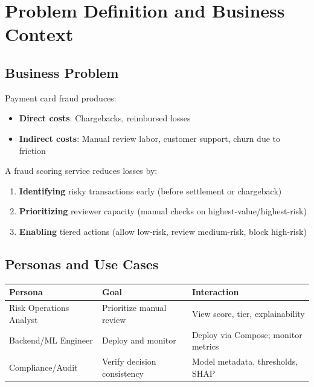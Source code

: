 \documentclass[12pt,a4paper]{article}
\begin{document}
\section{Problem Definition and Business Context}

\subsection{Business Problem}
Payment card fraud produces:
\begin{itemize}
    \item \textbf{Direct costs}: Chargebacks, reimbursed losses
    \item \textbf{Indirect costs}: Manual review labor, customer support, churn due to friction
\end{itemize}

A fraud scoring service reduces losses by:
\begin{enumerate}
    \item \textbf{Identifying} risky transactions early (before settlement or chargeback)
    \item \textbf{Prioritizing} reviewer capacity (manual checks on highest-value/highest-risk)
    \item \textbf{Enabling} tiered actions (allow low-risk, review medium-risk, block high-risk)
\end{enumerate}

\subsection{Personas and Use Cases}
\begin{table}[H]
\centering
\begin{tabular}{|l|l|l|}
\hline
\textbf{Persona} & \textbf{Goal} & \textbf{Interaction} \\
\hline
Risk Operations Analyst & Prioritize manual review & View score, tier, explainability \\
\hline
Backend/ML Engineer & Deploy and monitor & Deploy via Compose; monitor metrics \\
\hline
Compliance/Audit & Verify decision consistency & Model metadata, thresholds, SHAP \\
\hline
\end{tabular}
\end{table}

\end{document}
